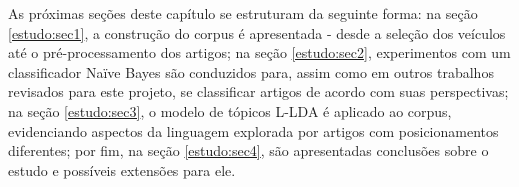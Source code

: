 
As próximas seções deste capítulo se estruturam da seguinte forma: na seção \ref{estudo:sec1}, a construção do corpus é apresentada - desde a seleção dos veículos até o pré-processamento dos artigos; na seção \ref{estudo:sec2}, experimentos com um classificador Naïve Bayes são conduzidos para, assim como em outros trabalhos revisados para este projeto, se classificar artigos de acordo com suas perspectivas; na seção \ref{estudo:sec3}, o modelo de tópicos L-LDA é aplicado ao corpus, evidenciando aspectos da linguagem explorada por artigos com posicionamentos diferentes; por fim, na seção \ref{estudo:sec4}, são apresentadas conclusões sobre o estudo e possíveis extensões para ele. %






